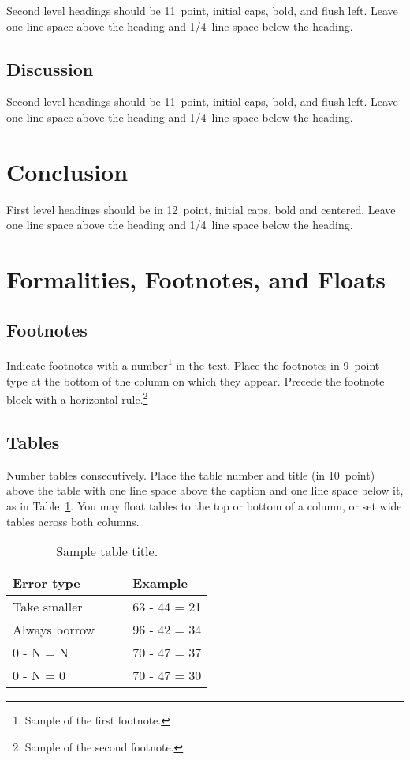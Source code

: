 \documentclass[10pt,letterpaper]{article}
\begin{document}
Second level headings should be 11~point, initial caps, bold, and
flush left. Leave one line space above the heading and 1/4~line
space below the heading.

\subsection{Discussion}

Second level headings should be 11~point, initial caps, bold, and
flush left. Leave one line space above the heading and 1/4~line
space below the heading.

\section{Conclusion}

First level headings should be in 12~point, initial caps, bold and
centered. Leave one line space above the heading and 1/4~line space
below the heading.



\section{Formalities, Footnotes, and Floats}




\subsection{Footnotes}

Indicate footnotes with a number\footnote{Sample of the first
footnote.} in the text. Place the footnotes in 9~point type at the
bottom of the column on which they appear. Precede the footnote block
with a horizontal rule.\footnote{Sample of the second footnote.}


\subsection{Tables}

Number tables consecutively. Place the table number and title (in
10~point) above the table with one line space above the caption and
one line space below it, as in Table~\ref{sample-table}. You may float
tables to the top or bottom of a column, or set wide tables across
both columns.

\begin{table}[!ht]
\begin{center} 
\caption{Sample table title.} 
\label{sample-table} 
\vskip 0.12in
\begin{tabular}{ll} 
\hline
Error type    &  Example \\
\hline
Take smaller        &   63 - 44 = 21 \\
Always borrow~~~~   &   96 - 42 = 34 \\
0 - N = N           &   70 - 47 = 37 \\
0 - N = 0           &   70 - 47 = 30 \\
\hline
\end{tabular} 
\end{center} 
\end{table}
\end{document}
